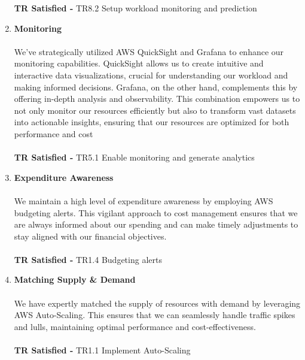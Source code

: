 \documentclass{article}
\begin{document}
\begin{enumerate}
    \textbf{TR Satisfied -} TR8.2 Setup workload monitoring and prediction
    \item \textbf{Monitoring}\cite{monitoring} \\\\
    We've strategically utilized AWS QuickSight and Grafana to enhance our monitoring capabilities. QuickSight allows us to create intuitive and interactive data visualizations, crucial for understanding our workload and making informed decisions. Grafana, on the other hand,  complements this by offering in-depth analysis and observability. This combination empowers us to not only monitor our resources efficiently but also to transform vast datasets into actionable insights, ensuring that our resources are optimized for both performance and cost\\\\
    \textbf{TR Satisfied -} TR5.1 Enable monitoring and generate analytics
    \newpage
    \item \textbf{Expenditure Awareness}\cite{Expenditure and usage awareness} \\\\
    We maintain a high level of expenditure awareness by employing AWS budgeting alerts. This vigilant approach to cost management ensures that we are always informed about our spending and can make timely adjustments to stay aligned with our financial objectives.\\\\
    \textbf{TR Satisfied -} TR1.4 Budgeting alerts

    \item \textbf{Matching Supply \& Demand}\cite{Manage demand and supply resources} \\\\
   We have expertly matched the supply of resources with demand by leveraging AWS Auto-Scaling. This ensures that we can seamlessly handle traffic spikes and lulls, maintaining optimal performance and cost-effectiveness.\\\\
    \textbf{TR Satisfied -} TR1.1 Implement Auto-Scaling

    
    
\end{enumerate}
\end{document}
